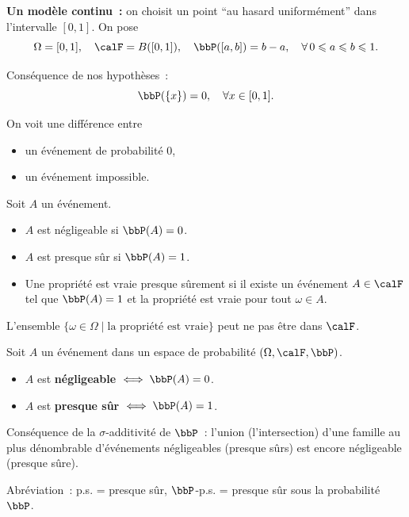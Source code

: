 \textbf{Un modèle continu~:} on choisit un point ``au hasard uniformément'' dans l'intervalle $[0, 1]$.
On pose
\[ \Omega = [0, 1], \quad \calF = B([0, 1]), \quad \bbP([a, b]) = b - a, \quad \forall\, 0 \leqslant a \leqslant b \leqslant 1. \]

\begin{rqq}
    Conséquence de nos hypothèses~:
    \[ \bbP(\{ x \}) = 0, \quad \forall x \in [0, 1]. \]

    On voit une différence entre
    \begin{itemize}
        \item un événement de probabilité 0,
        \item un événement impossible.
    \end{itemize}
\end{rqq}

\begin{deff}
    Soit $A$ un événement.
    \begin{itemize}
        \item $A$ est négligeable si $\bbP(A) = 0$.
        \item $A$ est presque sûr si $\bbP(A) = 1$.
        \item Une propriété est vraie presque sûrement si
              il existe un événement $A \in \calF$ tel que $\bbP(A) = 1$
              et la propriété est vraie pour tout $\omega \in A$.
    \end{itemize}
\end{deff}

\begin{rqq}
    L'ensemble $\{ \omega \in \Omega \mid \text{la propriété est vraie} \}$ peut ne pas être dans $\calF$.
\end{rqq}

\begin{rqq}
    Soit $A$ un événement dans un espace de probabilité $(\Omega, \calF, \bbP)$.
    \begin{itemize}
        \item $A$ est \textbf{négligeable} $\iff \bbP(A) = 0$.
        \item $A$ est \textbf{presque sûr} $\iff \bbP(A) = 1$.
    \end{itemize}

    Conséquence de la $\sigma$-additivité de $\bbP$~:
    l'union (l'intersection) d'une famille au plus dénombrable d'événements négligeables (presque sûrs) est encore négligeable (presque sûre).

    Abréviation~: p.s. = presque sûr, $\bbP$-p.s. = presque sûr sous la probabilité $\bbP$.
\end{rqq}

